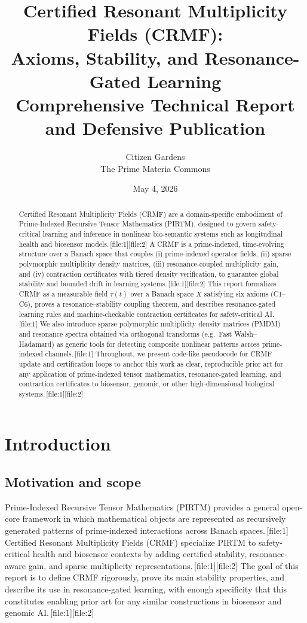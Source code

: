 \documentclass[11pt]{article}
\title{Certified Resonant Multiplicity Fields (CRMF):\\
Axioms, Stability, and Resonance-Gated Learning\\
\large Comprehensive Technical Report and Defensive Publication}
\author{Citizen Gardens \\ The Prime Materia Commons}
\date{May 4, 2026}
\begin{document}
\maketitle

\begin{abstract}
Certified Resonant Multiplicity Fields (CRMF) are a domain-specific embodiment of Prime-Indexed Recursive Tensor Mathematics (PIRTM), designed to govern safety-critical learning and inference in nonlinear bio-semantic systems such as longitudinal health and biosensor models.\,[file:1][file:2]
A CRMF is a prime-indexed, time-evolving structure over a Banach space that couples (i) prime-indexed operator fields, (ii) sparse polymorphic multiplicity density matrices, (iii) resonance-coupled multiplicity gain, and (iv) contraction certificates with tiered density verification, to guarantee global stability and bounded drift in learning systems.\,[file:1][file:2]
This report formalizes CRMF as a measurable field $\tau(t)$ over a Banach space $X$ satisfying six axioms (C1--C6), proves a resonance--stability coupling theorem, and describes resonance-gated learning rules and machine-checkable contraction certificates for safety-critical AI.\,[file:1]
We also introduce sparse polymorphic multiplicity density matrices (PMDM) and resonance spectra obtained via orthogonal transforms (e.g.\ Fast Walsh--Hadamard) as generic tools for detecting composite nonlinear patterns across prime-indexed channels.\,[file:1]
Throughout, we present code-like pseudocode for CRMF update and certification loops to anchor this work as clear, reproducible prior art for any application of prime-indexed tensor mathematics, resonance-gated learning, and contraction certificates to biosensor, genomic, or other high-dimensional biological systems.\,[file:1][file:2]
\end{abstract}
\newpage
\tableofcontents

\section{Introduction}

\subsection{Motivation and scope}

Prime-Indexed Recursive Tensor Mathematics (PIRTM) provides a general open-core framework in which mathematical objects are represented as recursively generated patterns of prime-indexed interactions across Banach spaces.\,[file:1]
Certified Resonant Multiplicity Fields (CRMF) specialize PIRTM to safety-critical health and biosensor contexts by adding certified stability, resonance-aware gain, and sparse multiplicity representations.\,[file:1][file:2]
The goal of this report is to define CRMF rigorously, prove its main stability properties, and describe its use in resonance-gated learning, with enough specificity that this constitutes enabling prior art for any similar constructions in biosensor and genomic AI.\,[file:1][file:2]
\end{document}
